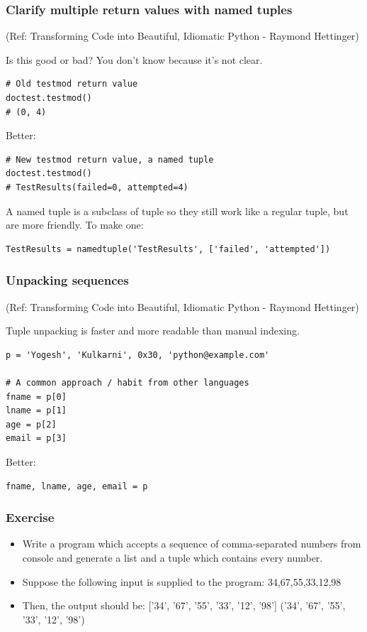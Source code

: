 \begin{frame}[fragile]\frametitle{Clarify multiple return values with named tuples}
\tiny{(Ref: Transforming Code into Beautiful, Idiomatic Python -  Raymond Hettinger)}

Is this good or bad? You don't know because it's not clear.
\begin{lstlisting}
# Old testmod return value
doctest.testmod()
# (0, 4)
\end{lstlisting}
Better:
\begin{lstlisting}
# New testmod return value, a named tuple
doctest.testmod()
# TestResults(failed=0, attempted=4)
\end{lstlisting}

A named tuple is a subclass of tuple so they still work like a regular tuple, but are more friendly. To make one:
\begin{lstlisting}
TestResults = namedtuple('TestResults', ['failed', 'attempted'])
\end{lstlisting}
\end{frame}

\begin{frame}[fragile]\frametitle{Unpacking sequences}
\tiny{(Ref: Transforming Code into Beautiful, Idiomatic Python -  Raymond Hettinger)}

Tuple unpacking is faster and more readable than manual indexing.
\begin{lstlisting}
p = 'Yogesh', 'Kulkarni', 0x30, 'python@example.com'

# A common approach / habit from other languages
fname = p[0]
lname = p[1]
age = p[2]
email = p[3]
\end{lstlisting}
Better:
\begin{lstlisting}
fname, lname, age, email = p
\end{lstlisting}
\end{frame}

\begin{frame}[fragile]\frametitle{Exercise}
\begin{itemize}
\item Write a program which accepts a sequence of comma-separated numbers from console and generate a list and a tuple which contains every number.
\item Suppose the following input is supplied to the program: 34,67,55,33,12,98
\item Then, the output should be: ['34', '67', '55', '33', '12', '98'] ('34', '67', '55', '33', '12', '98')
\end{itemize}
\end{frame}

